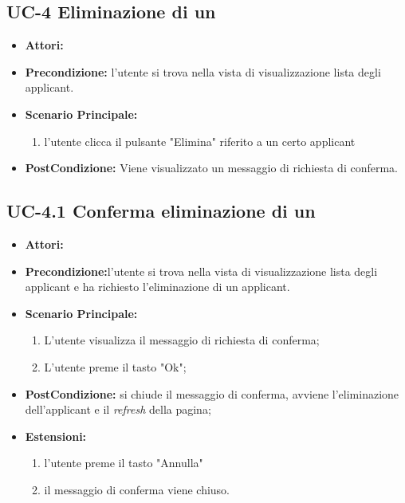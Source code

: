 \subsection{UC-4 Eliminazione di un\applicant}
\begin{itemize}
\item \textbf{Attori:}\loggedusr
\item \textbf{Precondizione:} l'utente si trova nella vista di visualizzazione lista degli applicant.
\item \textbf{Scenario Principale:}
\begin{enumerate}
	\item l'utente clicca il pulsante "Elimina" riferito a un certo applicant
\end{enumerate}
\item \textbf{PostCondizione:} Viene visualizzato un messaggio di richiesta di conferma.
\end{itemize}


\subsection{UC-4.1 Conferma eliminazione di un\applicant}
\begin{itemize}
\item \textbf{Attori:}\loggedusr
\item \textbf{Precondizione:}l'utente si trova nella vista di visualizzazione lista degli applicant e ha richiesto l'eliminazione di un applicant.
\item \textbf{Scenario Principale:}
\begin{enumerate}
	\item L'utente visualizza il messaggio di richiesta di conferma;
	\item L'utente preme il tasto "Ok";
\end{enumerate}
\item \textbf{PostCondizione:} si chiude il messaggio di conferma, avviene l'eliminazione dell'applicant e il \textit{refresh} della pagina;
\item \textbf{Estensioni:} 
\begin{enumerate}
	\item l'utente preme il tasto "Annulla"
	\item il messaggio di conferma viene chiuso.
\end{enumerate}
\end{itemize}

